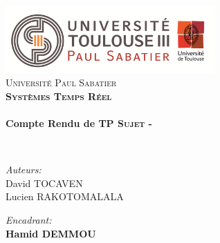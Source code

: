 
\begin{titlepage}
\begin{center}


\includegraphics[width=0.60\textwidth]{./page_de_garde/logo_ups.png}~\\[1cm]

\textsc{\LARGE Université Paul Sabatier}\\[1.5cm]

\textsc{\Large \bf Systèmes Temps Réel }\\[0.5cm]

\HRule \\[0.4cm]

{\huge \bfseries  Compte Rendu de TP \textsc{Sujet} -}

\HRule \\[1.5cm]

\begin{minipage}{0.4\textwidth}
\begin{flushleft} \large
\emph{Auteurs: }\\
David \textsc{TOCAVEN}\\
Lucien \textsc{RAKOTOMALALA}\\
\end{flushleft}
\end{minipage}
\begin{minipage}{0.58\textwidth}
\begin{flushright} \large
\emph{Encadrant:} \\
\textbf{ Hamid  \textsc{DEMMOU}}
\end{flushright}
\end{minipage}
\newline
\newline



\end{center}
\end{titlepage}
